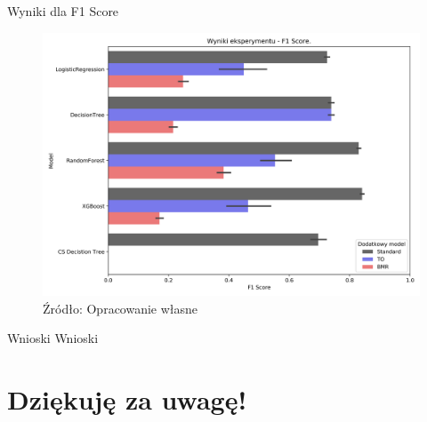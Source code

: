 \documentclass{beamer}
\begin{document}
\begin{frame}{Wyniki dla F1 Score}
	\begin{figure}
		\includegraphics[width=0.8\linewidth]{images/100_config1-F1.png}
		\caption{Źródło: Opracowanie własne}
	\end{figure}
\end{frame}

\begin{frame}{Wnioski}
	Wnioski
\end{frame}

\section[]{Dziękuję za uwagę!}
\end{document}
